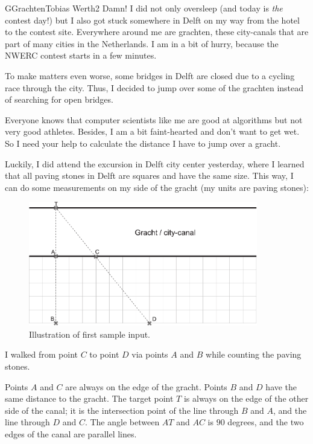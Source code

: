 \begin{icpcproblem}{G}{Grachten}{Tobias Werth}{2}
Damn! I did not only oversleep (and today is \emph{the} contest day!) but
I also got stuck somewhere in Delft on my way from the hotel to the contest
site. Everywhere around me are grachten, these city-canals that are part of
many cities in the Netherlands. I am in a bit of hurry, because the
NWERC contest starts in a few minutes.

To make matters even worse, some bridges in Delft are closed due to a cycling
race through the city. Thus, I decided to jump over some of the grachten
instead of searching for open bridges.

Everyone knows that computer scientists like me are good at algorithms but
not very good athletes. Besides, I am a bit faint-hearted and don't want to get
wet. So I need your help to calculate the distance I have to
jump over a gracht.

Luckily, I did attend the excursion in Delft city center yesterday, where I
learned that all paving stones in Delft are squares and have the same size.
This way, I can do some measurements on my side of the gracht (my units are
paving stones):

\begin{figure}[h]
	\centering
	\includegraphics[width=10cm]{gracht}
	\caption{Illustration of first sample input.}
\end{figure}

I walked from point $C$ to point $D$ via points $A$ and $B$ while
counting the paving stones.

Points $A$ and $C$ are always on the edge of the gracht.
Points $B$ and $D$ have the same distance to the gracht.
The target point $T$ is always on the edge of the other side of the canal;
    it is the intersection point of the line through $B$ and $A$, and the line through $D$ and $C$.
The angle between $AT$ and $AC$ is $90$ degrees, and the two edges of the canal are parallel lines.


\end{icpcproblem}

